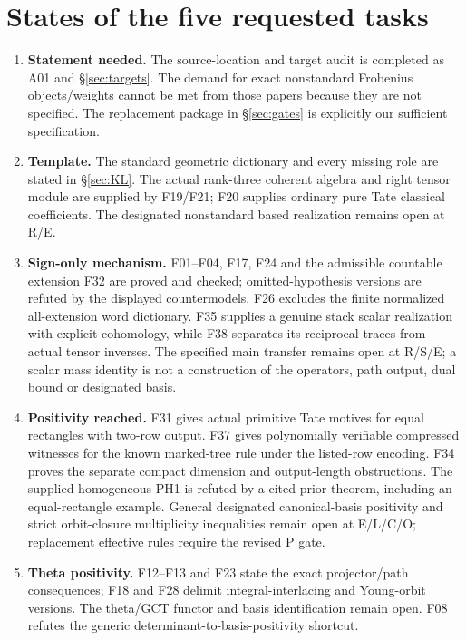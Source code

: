 \section{States of the five requested tasks}
\begin{enumerate}
\item \textbf{Statement needed.} The source-location and target audit is completed as A01 and \S\ref{sec:targets}. The demand for exact nonstandard Frobenius objects/weights cannot be met from those papers because they are not specified. The replacement package in \S\ref{sec:gates} is explicitly our sufficient specification.
\item \textbf{Template.} The standard geometric dictionary and every missing role are stated in \S\ref{sec:KL}. The actual rank-three coherent algebra and right tensor module are supplied by F19/F21; F20 supplies ordinary pure Tate classical coefficients. The designated nonstandard based realization remains open at R/E.
\item \textbf{Sign-only mechanism.} F01--F04, F17, F24 and the admissible countable extension F32 are proved and checked; omitted-hypothesis versions are refuted by the displayed countermodels. F26 excludes the finite normalized all-extension word dictionary. F35 supplies a genuine stack scalar realization with explicit cohomology, while F38 separates its reciprocal traces from actual tensor inverses. The specified main transfer remains open at R/S/E; a scalar mass identity is not a construction of the operators, path output, dual bound or designated basis.
\item \textbf{Positivity reached.} F31 gives actual primitive Tate motives for equal rectangles with two-row output. F37 gives polynomially verifiable compressed witnesses for the known marked-tree rule under the listed-row encoding. F34 proves the separate compact dimension and output-length obstructions. The supplied homogeneous PH1 is refuted by a cited prior theorem, including an equal-rectangle example. General designated canonical-basis positivity and strict orbit-closure multiplicity inequalities remain open at E/L/C/O; replacement effective rules require the revised P gate.
\item \textbf{Theta positivity.} F12--F13 and F23 state the exact projector/path consequences; F18 and F28 delimit integral-interlacing and Young-orbit versions. The theta/GCT functor and basis identification remain open. F08 refutes the generic determinant-to-basis-positivity shortcut.
\end{enumerate}

